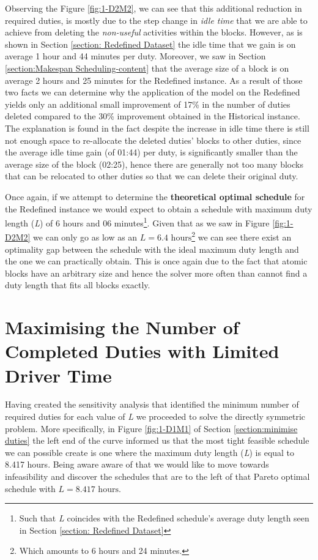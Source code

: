 \vspace{\baselineskip}
\noindent
Observing the Figure \ref{fig:1-D2M2}, we can see that this additional reduction in required duties, is mostly due to the step change in \textit{idle time} that we are able to achieve from deleting the \textit{non-useful} activities within the blocks. However, as is shown in Section \ref{section: Redefined Dataset} the idle time that we gain is on average 1 hour and 44 minutes per duty. Moreover, we saw in Section \ref{section:Makespan Scheduling-content} that the average size of a block is on average 2 hours and 25 minutes for the Redefined instance. As a result of those two facts we can determine why the application of the model on the Redefined yields only an additional small improvement of 17\% in the number of duties deleted compared to the 30\% improvement obtained in the Historical instance. The explanation is found in the fact despite the increase in idle time there is still not enough space to re-allocate the deleted duties' blocks to other duties, since the average idle time gain (of 01:44) per duty, is significantly smaller than the average size of the block (02:25), hence there are generally not too many blocks that can be relocated to other duties so that we can delete their original duty.


\vspace{\baselineskip}
\noindent
Once again, if we attempt to determine the \textbf{theoretical optimal schedule} for the Redefined instance we would expect to obtain a schedule with maximum duty length (\textit{L}) of 6 hours and 06 minutes\footnote{Such that \textit{L} coincides with the Redefined schedule's average duty length seen in Section \ref{section: Redefined Dataset}}. Given that as we saw in Figure \ref{fig:1-D2M2} we can only go as low as an  $L=6.4 \text{ hours}$\footnote{Which amounts to 6 hours and 24 minutes.}  we can see there exist an optimality gap between the schedule with the ideal maximum duty length and the one we can practically obtain. This is once again due to the fact that atomic blocks have an arbitrary size and hence the solver more often than cannot find a duty length that fits all blocks exactly. 
\section{Maximising the Number of Completed Duties with Limited Driver Time}
\label{section: maximise blocks}
Having created the sensitivity analysis that identified the minimum number of required duties for each value of \textit{L} we proceeded to solve the directly symmetric problem. More specifically, in Figure \ref{fig:1-D1M1} of Section \ref{section:minimise duties} the left end of the curve informed us that the most tight feasible schedule we can possible create is one where the maximum duty length (\textit{L}) is equal to 8.417 hours. Being aware aware of that we would like to move towards infeasibility and discover the schedules that are to the left of that Pareto optimal schedule with $L=8.417 \text{ hours}$.

